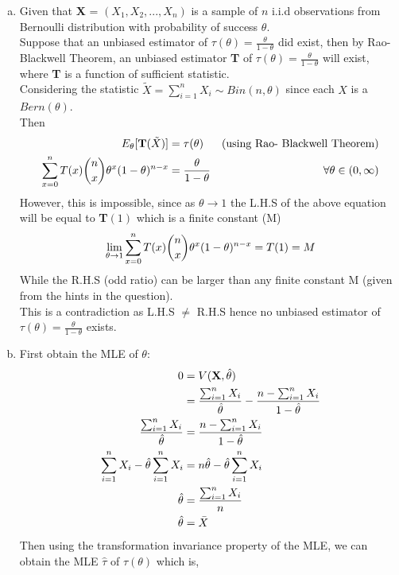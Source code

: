 \documentclass[a4paper,11pt]{article}
\begin{document}
\begin{enumerate}[(a)]
	\item Given that {\bf X} = $(X_1, X_2, ... , X_n)$ is a sample of $n$ i.i.d observations from Bernoulli distribution with probability of success $\theta$.
	\\Suppose that an unbiased estimator of $\tau(\theta) = \frac{\theta}{1-\theta}$ did exist, then by Rao- Blackwell Theorem, an unbiased estimator {\bf T} of $\tau(\theta)= \frac{\theta}{1-\theta}$ will exist, where {\bf T} is a function of sufficient statistic.
	\\Considering the statistic $\tilde{X} = \sum^n_{i=1}X_i \sim Bin(n,\theta)$ since each $X$ is a $Bern(\theta)$.
	\\Then
	\begin{align*}
	E_\theta[{\bf T}(\tilde{X})] &= \tau(\theta) & \mbox{(using  Rao- Blackwell Theorem)}\\
	\sum^n_{x=0}T(x)\dbinom{n}{x} \theta^x(1-\theta)^{n-x}&=\frac{\theta}{1-\theta}  & \forall \theta \in (0,\infty)
	\end{align*}
	However, this is impossible, since as $\theta \rightarrow 1$ the L.H.S of the above equation will be equal to {\bf T$(1)$} which is a finite constant (M)
	\[
	\lim_{\theta \rightarrow 1} \sum^n_{x=0}T(x)\dbinom{n}{x} \theta^x(1-\theta)^{n-x} = T(1) = M
	\]
	While the R.H.S (odd ratio) can be larger than any finite constant M (given from the hints in the question).
	\\This is a contradiction as L.H.S $\not=$ R.H.S hence no unbiased estimator of $\tau(\theta)=\frac{\theta}{1-\theta}$ exists.
	\item
		First obtain the MLE of $\theta$:
		\begin{align*}
		0 &= V({\bf X}, \hat{\theta}) \\
		&= \frac{\sum^n_{i=1} X_i}{\hat{\theta}} - \frac{n-\sum^n_{i=1}X_i}{1-\hat{\theta}}\\
		\frac{\sum^n_{i=1} X_i}{\hat{\theta}} &= \frac{n-\sum^n_{i=1} X_i}{1-\hat{\theta}}\\
		\sum^n_{i=1} X_i - \hat{\theta} \sum^n_{i=1} X_i &= n\hat{\theta} - \hat{\theta} \sum^n_{i=1} X_i\\
		\hat{\theta} &= \frac{\sum^n_{i=1} X_i}{n}\\
		\hat{\theta} &= \bar{X} \\
		\end{align*}
		Then using the transformation invariance property of the MLE, we can obtain the MLE $\hat{\tau}$ of $\tau(\theta)$ which is,

\end{enumerate}
\end{document}
